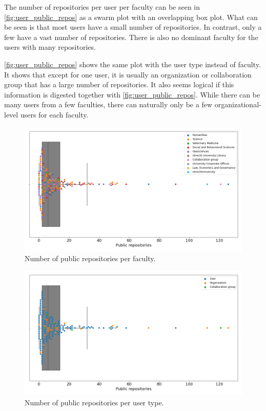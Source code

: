 The number of repositories per user per faculty can be seen in \autoref{fig:user_public_repos} as a swarm plot with an overlapping box plot. What can be seen is that most users have a small number of repositories. In contrast, only a few have a vast number of repositories. There is also no dominant faculty for the users with many repositories.


\autoref{fig:user_public_repos} shows the same plot with the user type instead of faculty. It shows that except for one user, it is usually an organization or collaboration group that has a large number of repositories. It also seems logical if this information is digested together with \autoref{fig:user_public_repos}. While there can be many users from a few faculties, there can naturally only be a few organizational-level users for each faculty.

\begin{figure}[h!]
\centerline{
\includegraphics[scale=0.47]{figures_results/user_public_repos.png}}
\caption{Number of public repositories per faculty.
\label{fig:user_public_repos}}
\end{figure}


\begin{figure}[h!]
\centerline{
\includegraphics[scale=0.47]{figures_results/user_public_repos_usertype.png}}
\caption{Number of public repositories per user type.
\label{fig:user_public_repos_usertype}}
\end{figure}

